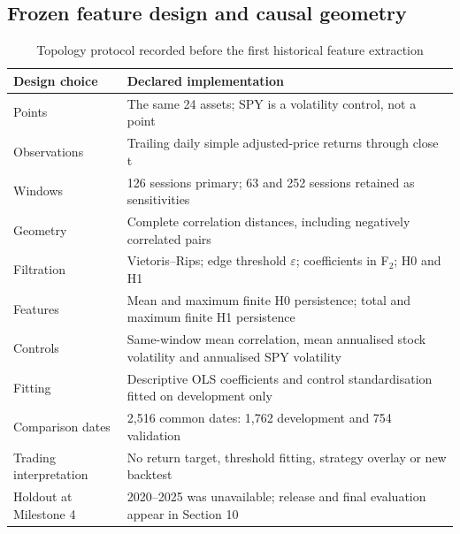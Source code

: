 \documentclass[12pt,a4paper,oneside]{article}
\begin{document}
\subsection{Frozen feature design and causal geometry}

\begingroup
\setcounter{table}{13}
\fontsize{10}{12.5}\selectfont
\renewcommand{\arraystretch}{1.12}
\begin{table}[!htbp]
\centering
{}\fontsize{10}{12.5}\selectfont
\begin{tabular}{P{0.300000\dimexpr{}\tabcolsep\relax}P{0.700000\dimexpr{}\tabcolsep\relax}}
\toprule
{} \textbf{Design choice} & \textbf{Declared implementation} \\ \midrule
Points & The same 24 assets; SPY is a volatility control, not a point \\
\midrule[0.2pt]
Observations & Trailing daily simple adjusted-price returns through close t \\
\midrule[0.2pt]
Windows & 126 sessions primary; 63 and 252 sessions retained as sensitivities \\
\midrule[0.2pt]
Geometry & Complete correlation distances, including negatively correlated pairs \\
\midrule[0.2pt]
Filtration & Vietoris–Rips; edge threshold \(\varepsilon\); coefficients in F\(_2\); H0 and H1 \\
\midrule[0.2pt]
Features & Mean and maximum finite H0 persistence; total and maximum finite H1 persistence \\
\midrule[0.2pt]
Controls & Same-window mean correlation, mean annualised stock volatility and annualised SPY volatility \\
\midrule[0.2pt]
Fitting & Descriptive OLS coefficients and control standardisation fitted on development only \\
\midrule[0.2pt]
Comparison dates & 2,516 common dates: 1,762 development and 754 validation \\
\midrule[0.2pt]
Trading interpretation & No return target, threshold fitting, strategy overlay or new backtest \\
\midrule[0.2pt]
Holdout at Milestone 4 & 2020–2025 was unavailable; release and final evaluation appear in Section 10 \\
\bottomrule
\end{tabular}
\caption{Topology protocol recorded before the first historical feature extraction}\label{tab:14}
\end{table}
\endgroup
\end{document}

